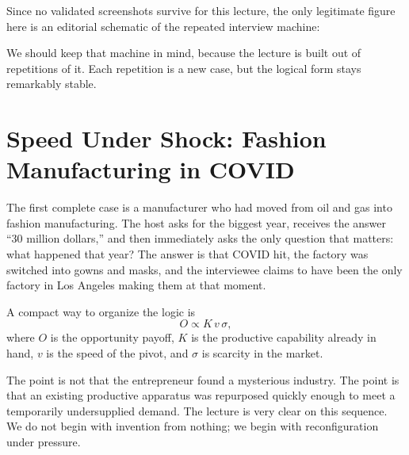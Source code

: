 Since no validated screenshots survive for this lecture, the only legitimate figure here is an editorial schematic of the repeated interview machine:

\begin{figure}
\begin{center}
\end{center}
\end{figure}

We should keep that machine in mind, because the lecture is built out of repetitions of it. Each repetition is a new case, but the logical form stays remarkably stable.

\section{Speed Under Shock: Fashion Manufacturing in COVID}

The first complete case is a manufacturer who had moved from oil and gas into fashion manufacturing. The host asks for the biggest year, receives the answer ``30 million dollars,'' and then immediately asks the only question that matters: what happened that year? The answer is that COVID hit, the factory was switched into gowns and masks, and the interviewee claims to have been the only factory in Los Angeles making them at that moment.

A compact way to organize the logic is
\begin{equation}
O \propto K\,v\,\sigma,
\end{equation}
where \(O\) is the opportunity payoff, \(K\) is the productive capability already in hand, \(v\) is the speed of the pivot, and \(\sigma\) is scarcity in the market.

The point is not that the entrepreneur found a mysterious industry. The point is that an existing productive apparatus was repurposed quickly enough to meet a temporarily undersupplied demand. The lecture is very clear on this sequence. We do not begin with invention from nothing; we begin with reconfiguration under pressure.

